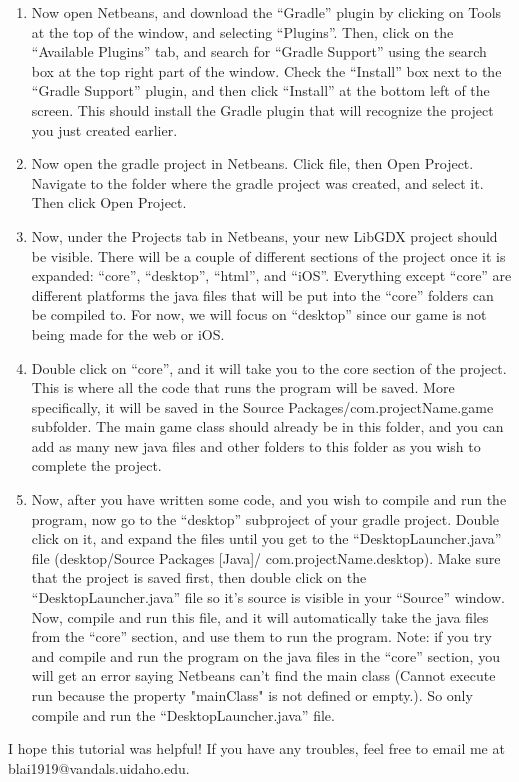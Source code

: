 \documentclass[12pt]{article}
\begin{document}
\begin{enumerate}
\item Now open Netbeans, and download the "`Gradle"' plugin by clicking on Tools at the top of the window, and selecting "`Plugins"'. Then, click on the "`Available Plugins"' tab, and search for "`Gradle Support"' using the search box at the top right part of the window. Check the "`Install"' box next to the "`Gradle Support"' plugin, and then click "`Install"' at the bottom left of the screen. This should install the Gradle plugin that will recognize the project you just created earlier.
\item Now open the gradle project in Netbeans. Click file, then Open Project. Navigate to the folder where the gradle project was created, and select it. Then click Open Project.
\item Now, under the Projects tab in Netbeans, your new LibGDX project should be visible. There will be a couple of different sections of the project once it is expanded: "`core"', "`desktop"', "`html"', and "`iOS"'. Everything except "`core"' are different platforms the java files that will be put into the "`core"' folders can be compiled to. For now, we will focus on "`desktop"' since our game is not being made for the web or iOS.
\item Double click on "`core"', and it will take you to the core section of the project. This is where all the code that runs the program will be saved. More specifically, it will be saved in the Source Packages/com.projectName.game subfolder. The main game class should already be in this folder, and you can add as many new java files and other folders to this folder as you wish to complete the project.
\item Now, after you have written some code, and you wish to compile and run the program, now go to the "`desktop"' subproject of your gradle project. Double click on it, and expand the files until you get to the "`DesktopLauncher.java"' file (desktop/Source Packages [Java]/ com.projectName.desktop). Make sure that the project is saved first, then double click on the "`DesktopLauncher.java"' file so it's source is visible in your "`Source"' window. Now, compile and run this file, and it will automatically take the java files from the "`core"' section, and use them to run the program. 
Note: if you try and compile and run the program on the java files in the "`core"' section, you will get an error saying Netbeans can't find the main class (Cannot execute run because the property "mainClass" is not defined or empty.). So only compile and run the "`DesktopLauncher.java"' file.
\end{enumerate}

\par
I hope this tutorial was helpful! If you have any troubles, feel free to email me at blai1919@vandals.uidaho.edu.
 
\item
\end{document}
